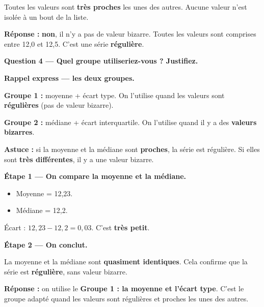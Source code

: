\documentclass[12pt,a4paper]{article}
\begin{document}
Toutes les valeurs sont \textbf{très proches} les unes des autres. Aucune valeur n'est isolée à un bout de la liste.

\vspace{0.3cm}
\textbf{Réponse :} \textbf{non}, il n'y a pas de valeur bizarre. Toutes les valeurs sont comprises entre 12,0 et 12,5. C'est une série \textbf{régulière}.

\vspace{0.5cm}

\begin{correctionbox}
\textbf{Question 4 — Quel groupe utiliseriez-vous ? Justifiez.}
\end{correctionbox}

\begin{rappelcible}
\textbf{Rappel express — les deux groupes.}

\vspace{0.2cm}
\textbf{Groupe 1 :} moyenne + écart type. On l'utilise quand les valeurs sont \textbf{régulières} (pas de valeur bizarre).

\vspace{0.2cm}
\textbf{Groupe 2 :} médiane + écart interquartile. On l'utilise quand il y a des \textbf{valeurs bizarres}.

\vspace{0.2cm}
\textbf{Astuce :} si la moyenne et la médiane sont \textbf{proches}, la série est régulière. Si elles sont \textbf{très différentes}, il y a une valeur bizarre.
\end{rappelcible}

\vspace{0.3cm}
\textbf{Étape 1 — On compare la moyenne et la médiane.}

\begin{itemize}[leftmargin=*]
  \item Moyenne = 12,23.
  \item Médiane = 12,2.
\end{itemize}

Écart : $12{,}23 - 12{,}2 = 0{,}03$. C'est \textbf{très petit}.

\vspace{0.3cm}
\textbf{Étape 2 — On conclut.}

La moyenne et la médiane sont \textbf{quasiment identiques}. Cela confirme que la série est \textbf{régulière}, sans valeur bizarre.

\vspace{0.3cm}
\textbf{Réponse :} on utilise le \textbf{Groupe 1 : la moyenne et l'écart type}. C'est le groupe adapté quand les valeurs sont régulières et proches les unes des autres.
\end{document}

